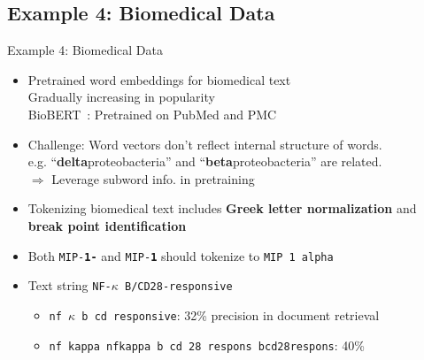 \documentclass{beamer}
\renewcommand{\cite}{\citep}
\begin{document}
\subsection{Example 4: Biomedical Data}







\begin{frame}{Example 4: Biomedical Data}
\begin{itemize}
\item Pretrained word embeddings for biomedical text\\ 
	Gradually increasing in popularity~\cite{wang2018comparison}\\
	BioBERT~\cite{lee2020biobert}: Pretrained on PubMed and PMC
\item Challenge: Word vectors don't reflect internal structure of words.\\
	e.g. ``\textbf{delta}proteobacteria'' and ``\textbf{beta}proteobacteria'' are related.\\
	$\Rightarrow$ Leverage subword info. in pretraining~\cite{zhang2019biowordvec}
	\bigskip
\item Tokenizing biomedical text includes \textbf{Greek letter normalization} and \textbf{break point identification}~\cite{jiang2007empirical}
\item Both \texttt{MIP-{\color{red}\textbf{1-}\boldmath{$\alpha$}}} and \texttt{MIP-{\color{red}\textbf{1}\boldmath{$\alpha$}}} should tokenize to \texttt{MIP 1 alpha}
\item Text string \texttt{NF-$\kappa$ B/CD28-responsive}{\small~\cite{trieschnigg2007influence}}
	\begin{itemize}
	\small
	\item \texttt{nf $\kappa$ b cd responsive}: 32\% precision in document retrieval
	\item \texttt{nf kappa nfkappa b cd 28 respons bcd28respons}: 40\%
	\end{itemize}
\end{itemize}
\end{frame}
\end{document}
